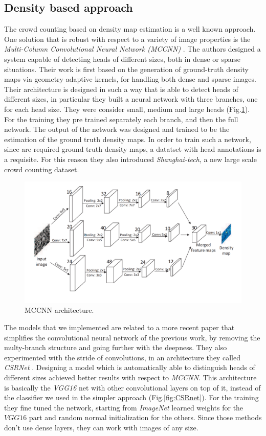 \documentclass[10pt,twocolumn,letterpaper]{article}
\begin{document}
\subsection{Density based approach}
The crowd counting based on density map estimation is a well known approach. One solution that is robust with respect to a variety of image properties is the \textit{Multi-Column Convolutional Neural Network (MCCNN)} \cite{zhang2016single}. The authors designed a system capable of detecting heads of different sizes, both in dense or sparse situations. Their work is first based on the generation of ground-truth density maps via geometry-adaptive kernels, for handling both dense and sparse images. Their architecture is designed in such a way that is able to detect heads of different sizes, in particular they built a neural network with three branches, one for each head size. They were consider small, medium and large heads (Fig.\ref{fig:MCCNN}). For the training they pre trained separately each branch, and then the full network. The output of the network was designed and trained to be the estimation of the ground truth density maps. In order to train such a network, since are required ground truth density maps, a datatset with head annotations is a requisite. For this reason they also introduced \textit{Shanghai-tech}, a new large scale crowd counting dataset. 

\begin{figure}[h!]
	\includegraphics[width=\linewidth]{pics/MCCNN.png}
	\caption{MCCNN architecture.}
	\label{fig:MCCNN}
\end{figure}


 The models that we implemented are related to a more recent paper that simplifies the convolutional neural network of the previous work, by removing the multy-branch structure and going further with the deepness. They also experimented with the stride of convolutions, in an architecture they called \textit{CSRNet} \cite{li2018csrnet}. Designing a model which is automatically able to distinguish heads of different sizes achieved better results with respect to \textit{MCCNN}. This architecture is basically the \textit{VGG16} net with other convolutional layers on top of it, instead of the classifier we used in the simpler approach (Fig.\ref{fig:CSRnet}). For the training they fine tuned the network, starting from \textit{ImageNet} learned weights for the $VGG16$ part and random normal initialization for the others. Since those methods \cite{zhang2016single,li2018csrnet} don't use dense layers, they can work with images of any size.
\end{document}
